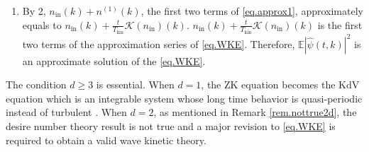 \begin{thm}
\begin{enumerate}
\begin{equation}
\begin{aligned}
            && \text{if } |k|\le \epsilon_1 l_{d}^{-1},
            \\
            &0, && \text{if } |k|\ge 2C_{2}  l_{d}^{-1}
        \end{aligned}\right.
    \end{equation}%
    and 
    \begin{equation}\label{eq.n(j)estimate}
        n^{(j)}(k)=O_{\ell^\infty_k}\left(L^{-\theta}\frac{t}{T_{\mathrm {kin}}}\right), \qquad j>1
    \end{equation}
    where $\mathcal K$ is defined in \eqref{eq.WKE}, and $O_{\ell^\infty_k}(A)$ (resp. $\widetilde{O}_{\ell^\infty_k}(A)$) is a quantity that is bounded by $A$ in $\ell^\infty_k$ by some universal constant (resp. constant just depending on $d$). The definition of universal constant can be found in section \ref{sec.notat}. The definition of $\text{Err}_D$ is 
    \begin{equation}
        \text{Err}_{D}(k_x)=\left\{\begin{aligned}
             &D^{d+1}, && \text{if } |k_x|\le D,
            \\
            &D^{d-1}(|k_x|^2+D|k_x|), && \text{if } |k_x|\ge D.
        \end{aligned}
        \right.
    \end{equation}
    \item By 2, $n_{\mathrm{in}}(k)+n^{(1)}(k)$, the first two terms of \eqref{eq.approx1}, approximately equals to $n_{\mathrm{in}}(k)+\frac{t}{T_{\mathrm{kin}}}\mathcal K(n_{\mathrm{in}})(k)$. $n_{\mathrm{in}}(k)+\frac{t}{T_{\mathrm{kin}}}\mathcal K(n_{\mathrm{in}})(k)$ is the first two terms of the approximation series of \eqref{eq.WKE}. Therefore, $\mathbb E |\widehat \psi(t, k)|^2$ is an approximate solution of the \eqref{eq.WKE}.
\end{enumerate}


\end{thm}

\begin{rem}
The condition $d\ge 3$ is essential. When $d=1$, the ZK equation becomes the KdV equation which is an integrable system whose long time behavior is quasi-periodic instead of turbulent \cite{jin2021cancellations}. When $d=2$, as mentioned in Remark \ref{rem.nottrue2d}, the desire number theory result is not true and a major revision to \eqref{eq.WKE} is required to obtain a valid wave kinetic theory.
\end{rem}

